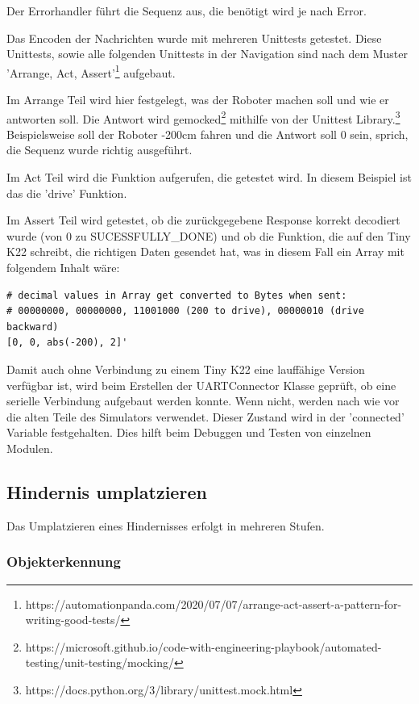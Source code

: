 Der Errorhandler führt die Sequenz aus, die benötigt wird je nach Error.

Das Encoden der Nachrichten wurde mit mehreren Unittests getestet. Diese Unittests, sowie alle folgenden Unittests in der Navigation sind nach dem Muster 'Arrange, Act, Assert'\footnote{https://automationpanda.com/2020/07/07/arrange-act-assert-a-pattern-for-writing-good-tests/} aufgebaut.

Im Arrange Teil wird hier festgelegt, was der Roboter machen soll und wie er antworten soll. Die Antwort wird gemocked\footnote{https://microsoft.github.io/code-with-engineering-playbook/automated-testing/unit-testing/mocking/} mithilfe von der Unittest Library.\footnote{https://docs.python.org/3/library/unittest.mock.html} Beispielsweise soll der Roboter -200cm fahren und die Antwort soll 0 sein, sprich, die Sequenz wurde richtig ausgeführt.

Im Act Teil wird die Funktion aufgerufen, die getestet wird. In diesem Beispiel ist das die 'drive' Funktion.

Im Assert Teil wird getestet, ob die zurückgegebene Response korrekt decodiert wurde (von 0 zu SUCESSFULLY\_DONE) und ob die Funktion, die auf den Tiny K22 schreibt, die richtigen Daten gesendet hat, was in diesem Fall ein Array mit folgendem Inhalt wäre:

\begin{verbatim}
# decimal values in Array get converted to Bytes when sent:
# 00000000, 00000000, 11001000 (200 to drive), 00000010 (drive backward)
[0, 0, abs(-200), 2]'
\end{verbatim}

Damit auch ohne Verbindung zu einem Tiny K22 eine lauffähige Version verfügbar ist, wird beim Erstellen der UARTConnector Klasse geprüft, ob eine serielle Verbindung aufgebaut werden konnte. Wenn nicht, werden nach wie vor die alten Teile des Simulators verwendet. Dieser Zustand wird in der 'connected' Variable festgehalten. Dies hilft beim Debuggen und Testen von einzelnen Modulen.


\newpage
\subsection{Hindernis umplatzieren}

Das Umplatzieren eines Hindernisses erfolgt in mehreren Stufen.



\subsubsection{Objekterkennung}

